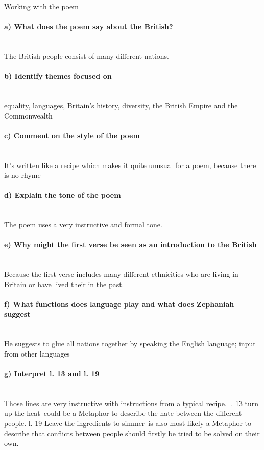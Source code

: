 \documentclass[12pt,a4paper]{report}
\begin{document}
	\thispagestyle{empty}
	\noindent
	\Large Working with the poem
	\large
	\paragraph{a) What does the poem say about the British?} \mbox{} \\
	The British people consist of many different nations.
	
	\paragraph{b) Identify themes focused on} \mbox{} \\
	equality, languages, Britain's history, diversity, the British Empire and the Commonwealth
	\paragraph{c) Comment on the style of the poem} \mbox{} \\
	It's written like a recipe which makes it quite unusual for a poem, because there is no rhyme
	\paragraph{d) Explain the tone of the poem} \mbox{} \\
	The poem uses a very instructive and formal tone.
	\paragraph{e) Why might the first verse be seen as an introduction to the British} \mbox{} \\
	Because the first verse includes many different ethnicities who are living in Britain or have lived their in the past.
	\paragraph{f) What functions does language play and what does Zephaniah suggest} \mbox{} \\
	He suggests to glue all nations together by speaking the English language; input from other languages
	\paragraph{g) Interpret l. 13 and l. 19} \mbox{} \\
	Those lines are very instructive with instructions from a typical recipe.
	l. 13 \dq turn up the heat\dq\ could be a Metaphor to describe the hate between the different people.
	l. 19 \dq Leave the ingredients to simmer\dq\ is also most likely a Metaphor to describe that conflicts between people should firstly be tried to be solved on their own.
\end{document}
